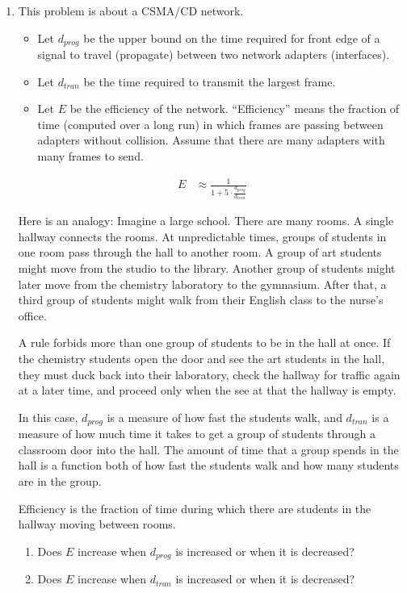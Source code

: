 \documentclass[twoside]{article}
\begin{document}
\begin{enumerate}
  \item This problem is about a CSMA/CD network.
  \begin{itemize}
    \item Let $d_{prog}$ be the upper bound on the time required
      for front edge of a signal to travel (propagate) between two network adapters (interfaces).
    \item Let $d_{tran}$ be the time required to transmit the largest frame.
    \item Let $E$ be the efficiency of the network. ``Efficiency'' means the
      fraction of time (computed over a long run) in which frames are passing
      between adapters without collision. Assume that there are many adapters
      with many frames to send.
    \end{itemize}

  \begin{align*}
    E & \approx \frac{1}{1 + 5 \cdot \frac{d_{prog}}{d_{tran}}}
    \end{align*}

    Here is an analogy: Imagine a large school. There are many rooms.
    A single hallway connects the rooms. At unpredictable times, groups of students in
    one room pass through the hall to another room. A group of art
    students might move from the studio to the library. Another group of
    students might later move from the chemistry laboratory to the gymnasium.
    After that, a third group of students might walk from their English class to
    the nurse's office.

    A rule forbids more than one group of students to be in the hall at once.
    If the chemistry students open the door and see the art students in the hall,
    they must duck back into their laboratory, check the hallway for traffic
    again at a later time, and proceed only when the see at that the hallway
    is empty.

    In this case, $d_{prog}$ is a measure of how fast the students walk,
    and $d_{tran}$ is a measure of how much time it takes to get a group
    of students through a classroom door into the hall.
    The amount of time that a group spends in the hall is a function
    both of how fast the students walk and how many students are in the
    group.

    Efficiency is the fraction of time during which there are students
    in the hallway moving between rooms.
    
    \begin{enumerate}
      \item Does $E$ increase when $d_{prog}$ is increased or when it is decreased?
      \item Does $E$ increase when $d_{tran}$ is increased or when it is decreased?
      \end{enumerate}


\end{enumerate}
\end{document}
